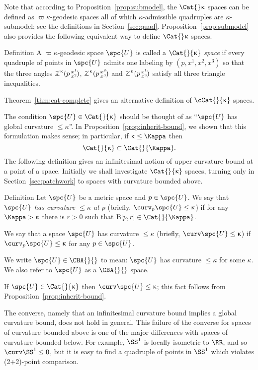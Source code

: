 Note that according to Proposition~\ref{prop:submodel},
the $\Cat{}\kappa$ spaces can be defined as $\varpi\kappa$-geodesic spaces 
all of which $\kappa$-admissible quadruples are $\kappa$-submodel;
see the definitions in Section~\ref{sec:quad}.
Proposition~\ref{prop:submodel} also provides the following equivalent way to define $\Cat{}\kappa$ spaces.

\begin{thm}{Definition}
\label{def:ccat-(3+1)}
A  $\varpi\kappa$-geodesic space $\spc{U}$
is called a \emph{$\Cat{}{\kappa}$ space} if every quadruple of points in $\spc{U}$ admits one labeling by $(p,x^1,x^2,x^3)$ so that the three angles 
$\angk\kappa p{x^1}{x^2}$,
$\angk\kappa p{x^2}{x^3}$ and
$\angk\kappa p{x^1}{x^3}$
satisfy all three triangle inequalities.
\end{thm}

Theorem~\ref{thm:cat-complete} gives an alternative definition of $\cCat{}{\kappa}$ spaces.

The condition $\spc{U}\in\Cat{}{\kappa}$ should be thought of as ``$\spc{U}$ has global curvature $\le\kappa$''.
In Proposition~\ref{prop:inherit-bound}, we shown that this formulation makes sense; 
in particular, if $\kappa\le\Kappa$ then
 $$\Cat{}{\kappa}\subset\Cat{}{\Kappa}.$$ 
The following definition gives an infinitesimal 
 notion of upper curvature bound at a point of a space.
Initially we shall investigate $\Cat{}{\kappa}$ spaces, turning only in Section~\ref{sec:patchwork} to spaces with curvature bounded above. 

\begin{thm}{Definition}\label{def:cba}
Let $\spc{U}$ be a metric space and $p\in\spc{U}$.
We say that \emph{$\spc{U}$ has curvature $\le\kappa$ at $p$} 
(briefly, $\curv_p \spc{U}\le\kappa$) 
if for any $\Kappa>\kappa$ there is $r>0$ such that $\oBall[p,r]\in\Cat{}{\Kappa}$.

We say that a space $\spc{U}$ has curvature $\le\kappa$ (briefly,  $\curv\spc{U}\le\kappa$) 
if $\curv_p \spc{U}\le\kappa$ for any $p\in\spc{U}$.

We write $\spc{U}\in\CBA{}{}$ to mean: $\spc{U}$ has curvature $\le\kappa$ for some $\kappa$.  We also refer to $\spc{U}$ as a $\CBA{}{}$ space.   
\end{thm}

If $\spc{U}\in\Cat{}{\kappa}$ then $\curv\spc{U}\le\kappa$; this fact follows from Proposition~\ref{prop:inherit-bound}.

The converse, namely that an infinitesimal curvature bound implies a global curvature bound, does not hold in general.  This failure of the converse  for spaces of curvature bounded above is one of the major differences with spaces of  curvature bounded below.
For example, $\SS^1$ is locally isometric to $\RR$, and so
$\curv\SS^1\le 0$, but it is easy to find a quadruple of points in $\SS^1$ which violates (2+2)-point comparison.  

